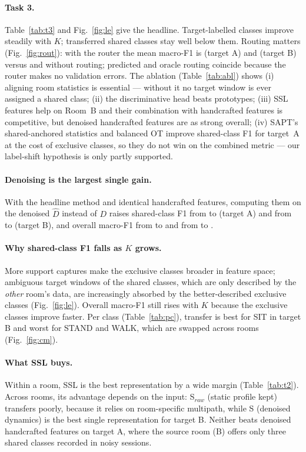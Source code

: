 \documentclass[11pt]{article}
\begin{document}
\paragraph{Task 3.} Table~\ref{tab:t3} and Fig.~\ref{fig:le} give the headline. Target-labelled classes
improve steadily with $K$; transferred shared classes stay well below them. Routing matters
(Fig.~\ref{fig:rout}): with the router the mean macro-F1 is \routPredA{} (target A) and \routPredB{}
(target B) versus \routNoneA{} and \routNoneB{} without routing; predicted and oracle routing coincide
because the router makes no validation errors. The ablation (Table~\ref{tab:abl}) shows (i) aligning room
statistics is essential --- without it no target window is ever assigned a shared class; (ii) the
discriminative head beats prototypes; (iii) SSL features help on Room~B and their combination with
handcrafted features is competitive, but denoised handcrafted features are as strong overall; (iv) SAPT's
shared-anchored statistics and balanced OT improve shared-class F1 for target~A at the cost of exclusive
classes, so they do not win on the combined metric --- our label-shift hypothesis is only partly supported.

\paragraph{Denoising is the largest single gain.} With the headline method and identical handcrafted
features, computing them on the denoised $\hat D$ instead of $D$ raises shared-class F1 from
\dnRawSharedA{} to \dnDenSharedA{} (target A) and from \dnRawSharedB{} to \dnDenSharedB{} (target B),
and overall macro-F1 from \dnRawMacroA{} to \dnDenMacroA{} and from \dnRawMacroB{} to \dnDenMacroB.

\paragraph{Why shared-class F1 falls as $K$ grows.} More support captures make the exclusive classes broader
in feature space; ambiguous target windows of the shared classes, which are only described by the
\emph{other} room's data, are increasingly absorbed by the better-described exclusive classes
(Fig.~\ref{fig:le}). Overall macro-F1 still rises with $K$ because the exclusive classes improve faster.
Per class (Table~\ref{tab:pc}), transfer is best for SIT in target B and worst for STAND and WALK, which are
swapped across rooms (Fig.~\ref{fig:cm}).

\paragraph{What SSL buys.} Within a room, SSL is the best representation by a wide margin (Table~\ref{tab:t2}).
Across rooms, its advantage depends on the input: S$_{raw}$ (static profile kept) transfers poorly, because
it relies on room-specific multipath, while S (denoised dynamics) is the best single representation for
target B. Neither beats denoised handcrafted features on target A, where the source room (B) offers only three
shared classes recorded in noisy sessions.
\end{document}
